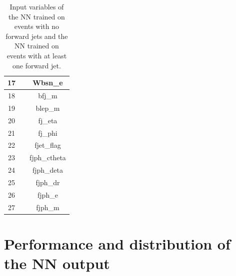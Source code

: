 \begin{table}
\begin{tabular}{c|c|c}
        17 &&                                           Wbsn\_e \\ \hline
        18 &&                                            bfj\_m \\ \hline
        19 &&                                           blep\_m \\ \hline
        20 &&                                           fj\_eta \\ \hline
        21 &&                                           fj\_phi \\ \hline
        22 &&                                        fjet\_flag \\ \hline
        23 &&                                      fjph\_ctheta \\ \hline
        24 &&                                        fjph\_deta \\ \hline
        25 &&                                          fjph\_dr \\ \hline
        26 &&                                           fjph\_e \\ \hline
        27 &&                                           fjph\_m \\ \hline
        \bottomrule 
    \end{tabular}
    \caption{Input variables of the NN trained on events with no forward jets and the NN trained on events with at least one forward jet.}
    \label{tab:features}
\end{table}


\section{Performance and distribution of the NN output}

